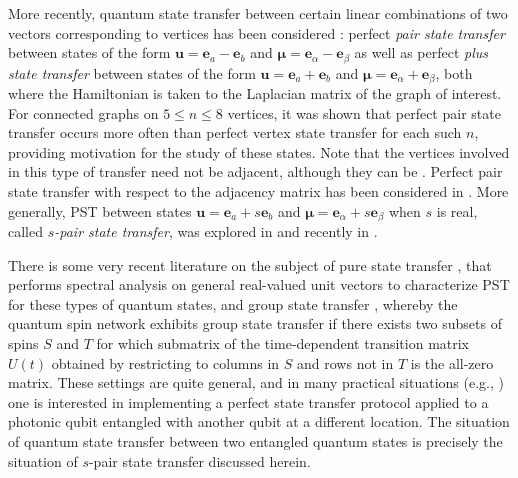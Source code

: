 \documentclass{article}
\numberwithin{equation}{section}
\newcommand{\be}{\mathbf e}
\newcommand{\bu}{\mathbf u}
\newcommand{\bmu}{{\boldsymbol{\mu}}}
\begin{document}
{More recently, quantum state transfer between certain linear combinations of two vectors corresponding to vertices has been considered \cite{Chen2020PairST}: perfect \emph{pair state transfer} between  states of the form $\bu=\be_a- \be_b$ and $\bmu = \be_{\alpha} -  \be_{\beta}$ as well as perfect \emph{plus state transfer} between states of the form $\bu=\be_a+ \be_b$ and $\bmu = \be_{\alpha} +  \be_{\beta}$, both where the Hamiltonian is taken to the  Laplacian matrix of the graph of interest. For connected graphs on $5\leq n\leq 8$ vertices, it was shown that perfect pair state transfer occurs more often than perfect vertex state transfer for each such $n$, providing motivation for the study of these states. Note that the vertices involved in this type of transfer need not be adjacent, although they can be \cite{chen2019edge}. Perfect pair state transfer with respect to the adjacency matrix has been considered in \cite{Pal2024}. More generally, PST between states $\bu=\be_a+s \be_b$ and $\bmu = \be_{\alpha} + s \be_{\beta}$ when $s$ is real, called \emph{$s$-pair state transfer}, was explored in \cite{kim2024generalization} and recently in \cite{monterde2025perfect}. 



There is some very recent literature on the subject of pure state transfer \cite{godsil2025perfect}, that performs spectral analysis on general real-valued unit vectors to characterize PST for these types of quantum states, and group state transfer \cite{brown2023continuous}, whereby the quantum spin network exhibits group state transfer if there exists two subsets of spins $S$ and $T$ for which submatrix of the time-dependent transition matrix $U(t)$ obtained by restricting to
columns in $S$ and rows not in $T$ is the all-zero matrix. These settings are quite general, and in many practical situations (e.g., \cite{chapman2016experimental}) one is interested in implementing
a perfect state transfer protocol applied to a photonic qubit entangled with another qubit at
a different location. The situation of quantum state transfer between two entangled quantum states is precisely the situation of $s$-pair state transfer discussed herein.


}
\end{document}
